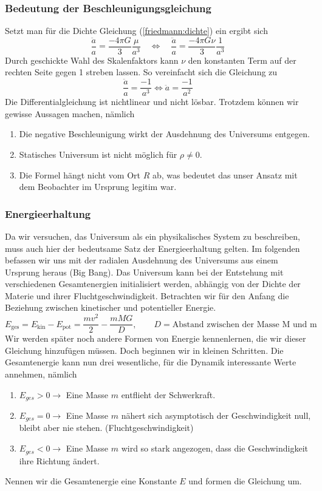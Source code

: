 \begin{refsection}
\subsubsection{Bedeutung der Beschleunigungsgleichung}
Setzt man für die Dichte Gleichung (\ref{friedmann:dichte}) ein ergibt sich
\[\frac{\ddot{a}}{a} = \frac{- 4 \pi G}{3} \frac{\mu}{a^3} \quad\Leftrightarrow \quad\frac{\ddot{a}}{a} = \frac{- 4 \pi G \nu}{3} \frac{1}{a^3}\]
Durch geschickte Wahl des Skalenfaktors kann $\nu$ den konstanten Term auf der rechten Seite gegen 1 streben lassen. So vereinfacht sich die Gleichung zu
\[\frac{\ddot{a}}{a} = \frac{-1}{a^3} \Leftrightarrow \ddot{a} = \frac{-1}{a^2}\]
Die Differentialgleichung ist nichtlinear  und nicht lösbar. Trotzdem können wir gewisse Aussagen machen, nämlich
\begin{enumerate}
	\item Die negative Beschleunigung wirkt der Ausdehnung des Universums entgegen. 
	\item Statisches Universum ist nicht möglich für $\rho \neq 0$.
	\item Die Formel hängt nicht vom Ort $R$ ab, was bedeutet das unser Ansatz mit dem Beobachter im Ursprung legitim war.
\end{enumerate}

\subsubsection{Energieerhaltung}
Da wir versuchen, das Universum als ein physikalisches System zu beschreiben, muss auch hier der bedeutsame Satz der Energieerhaltung gelten. Im folgenden befassen wir uns mit der radialen Ausdehnung des Universums aus einem Ursprung heraus (Big Bang). Das Universum kann bei der Entstehung mit verschiedenen Gesamtenergien initialisiert werden, abhängig von der Dichte der Materie und ihrer Fluchtgeschwindigkeit. Betrachten wir für den Anfang die Beziehung zwischen kinetischer und potentieller Energie.
\begin{equation}
E_{\text{ges}} = E_{\text{kin}} - E_{\text{pot}} =  \frac{m v^2}{2} - \frac{m M G }{D}, \qquad D = \text{Abstand zwischen der Masse M und m}
\end{equation}
Wir werden später noch andere Formen von Energie kennenlernen, die wir dieser Gleichung hinzufügen müssen. Doch beginnen wir in kleinen Schritten. Die Gesamtenergie kann nun drei wesentliche, für die Dynamik interessante Werte annehmen, nämlich
\begin{enumerate}
	\item $E_{ges} > 0 \rightarrow$ Eine Masse $m$ entflieht der Schwerkraft.
	\item $E_{ges} = 0 \rightarrow$ Eine Masse $m$ nähert sich asymptotisch  der Geschwindigkeit null, bleibt aber nie stehen. (Fluchtgeschwindigkeit)
	\item $E_{ges} < 0 \rightarrow$ Eine Masse $m$ wird so stark angezogen, dass die Geschwindigkeit ihre Richtung ändert.
\end{enumerate}
Nennen wir die Gesamtenergie eine Konstante $E$ und formen die Gleichung um.


\end{refsection}
